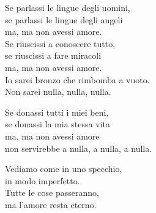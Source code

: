 
\strofa Se parlassi le lingue degli uomini,\\
se parlassi le lingue degli angeli\\
ma, ma non avessi amore.\\
Se riuscissi a conoscere tutto,\\
se riuscissi a fare miracoli\\
ma, ma non avessi amore.\\
Io sarei bronzo che rimbomba a vuoto.\\
Non sarei nulla, nulla, nulla.

\spazio


\spazio

\strofa Se donassi tutti i miei beni,\\
se donassi la mia stessa vita\\
ma, ma non avessi amore\\
non servirebbe a nulla, a nulla, a nulla.

\spazio


\spazio


\spazio

Vediamo come in uno specchio,\\
in modo imperfetto.\\
Tutte le cose passeranno,\\
ma l'amore resta eterno.

\spazio

